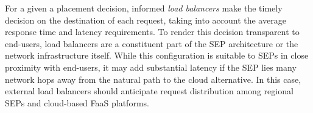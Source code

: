 
%


For a given a placement decision, informed \textit{load balancers} make the timely decision on the destination of each request, taking into account the average response time and latency requirements. 
To render this decision transparent to end-users, 
load balancers are a constituent part of the SEP architecture or the network infrastructure itself. 
While this configuration is suitable to SEPs in close proximity with end-users, it may add substantial latency if the SEP lies many network hops away from the natural path to the cloud alternative. In this case, external load balancers should anticipate request distribution among regional SEPs and cloud-based FaaS platforms.















